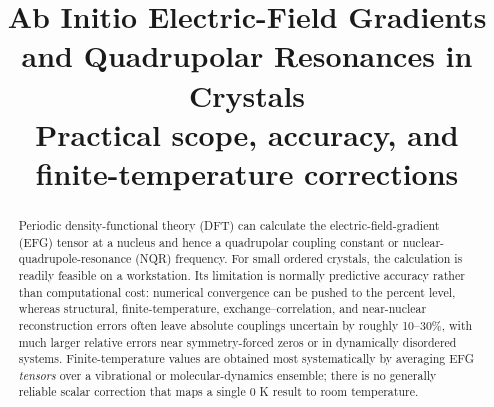 \documentclass[10pt]{article}
\title{\vspace{-1.25em}\textbf{Ab Initio Electric-Field Gradients and Quadrupolar Resonances in Crystals}\\[-1mm]
\large Practical scope, accuracy, and finite-temperature corrections}
\author{}
\date{}
\begin{document}
\maketitle
\vspace{-2.1em}

\begin{abstract}
\noindent
Periodic density-functional theory (DFT) can calculate the electric-field-gradient (EFG) tensor at a nucleus and hence a quadrupolar coupling constant or nuclear-quadrupole-resonance (NQR) frequency. For small ordered crystals, the calculation is readily feasible on a workstation. Its limitation is normally predictive accuracy rather than computational cost: numerical convergence can be pushed to the percent level, whereas structural, finite-temperature, exchange--correlation, and near-nuclear reconstruction errors often leave absolute couplings uncertain by roughly 10--30\%, with much larger relative errors near symmetry-forced zeros or in dynamically disordered systems. Finite-temperature values are obtained most systematically by averaging EFG \emph{tensors} over a vibrational or molecular-dynamics ensemble; there is no generally reliable scalar correction that maps a single 0 K result to room temperature.
\end{abstract}
\end{document}
